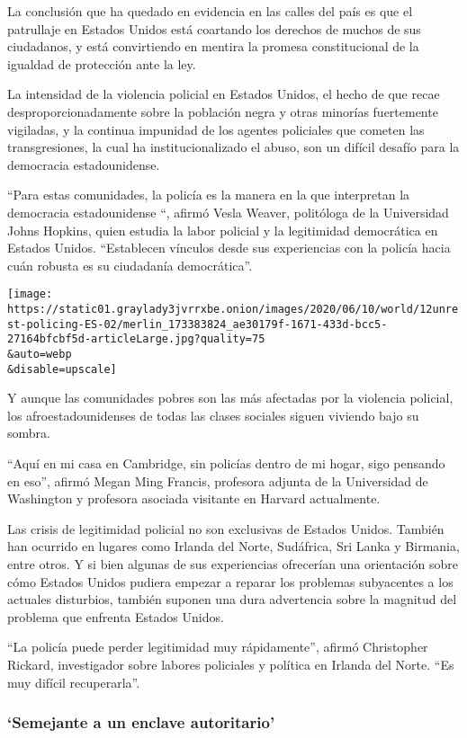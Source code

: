 La conclusión que ha quedado en evidencia en las calles del país es que
el patrullaje en Estados Unidos está coartando los derechos de muchos de
sus ciudadanos, y está convirtiendo en mentira la promesa constitucional
de la igualdad de protección ante la ley.

La intensidad de la violencia policial en Estados Unidos, el hecho de
que recae desproporcionadamente sobre la población negra y otras
minorías fuertemente vigiladas, y la continua impunidad de los agentes
policiales que cometen las transgresiones, la cual ha institucionalizado
el abuso, son un difícil desafío para la democracia estadounidense.

``Para estas comunidades, la policía es la manera en la que interpretan
la democracia estadounidense ``, afirmó Vesla Weaver, politóloga de la
Universidad Johns Hopkins, quien estudia la labor policial y la
legitimidad democrática en Estados Unidos. ``Establecen vínculos desde
sus experiencias con la policía hacia cuán robusta es su ciudadanía
democrática''.

\texttt{[image: https://static01.graylady3jvrrxbe.onion/images/2020/06/10/world/12unrest-policing-ES-02/merlin\_173383824\_ae30179f-1671-433d-bcc5-27164bfcbf5d-articleLarge.jpg?quality=75\\\&auto=webp\\\&disable=upscale]}

Y aunque las comunidades pobres son las más afectadas por la violencia
policial, los afroestadounidenses de todas las clases sociales siguen
viviendo bajo su sombra.

``Aquí en mi casa en Cambridge, sin policías dentro de mi hogar, sigo
pensando en eso'', afirmó Megan Ming Francis, profesora adjunta de la
Universidad de Washington y profesora asociada visitante en Harvard
actualmente.

Las crisis de legitimidad policial no son exclusivas de Estados Unidos.
También han ocurrido en lugares como Irlanda del Norte, Sudáfrica, Sri
Lanka y Birmania, entre otros. Y si bien algunas de sus experiencias
ofrecerían una orientación sobre cómo Estados Unidos pudiera empezar a
reparar los problemas subyacentes a los actuales disturbios, también
suponen una dura advertencia sobre la magnitud del problema que enfrenta
Estados Unidos.

``La policía puede perder legitimidad muy rápidamente'', afirmó
Christopher Rickard, investigador sobre labores policiales y política en
Irlanda del Norte. ``Es muy difícil recuperarla''.

\hypertarget{semejante-a-un-enclave-autoritario}{%
\subsubsection{`Semejante a un enclave
autoritario'}\label{semejante-a-un-enclave-autoritario}}

